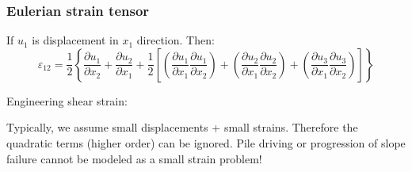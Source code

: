 \documentclass[notes]{beamer}
\begin{document}
\begin{frame}
\frametitle{Eulerian strain tensor}
If $u_1$ is displacement in $x_1$ direction. Then:
\begin{equation*}
\varepsilon_{12} = \frac{1}{2}\left\{\frac{\partial u_1}{\partial x_2} + \frac{\partial u_2}{\partial x_1} + \frac{1}{2} \left[\left(\frac{\partial u_1}{\partial x_1}\frac{\partial u_1}{\partial x_2}\right) +
\left(\frac{\partial u_2}{\partial x_1}\frac{\partial u_2}{\partial x_2}\right) + \left(\frac{\partial u_3}{\partial x_1}\frac{\partial u_3}{\partial x_2}\right)\right]\right\}
\end{equation*}

Engineering shear strain: 

Typically, we assume small displacements + small strains. Therefore the quadratic terms (higher order) can be ignored. Pile driving or progression of slope failure cannot be modeled as a small strain problem!
\end{frame}
\end{document}
